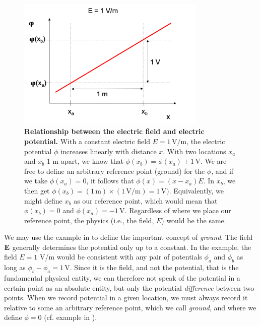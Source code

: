 \begin{figure}[!ht]
\begin{center}
\includegraphics[width=0.8\textwidth]{Figures/Basics/Ground.png}
\end{center}
\caption{\textbf{Relationship between the electric field and electric potential.} With a constant electric field $E = 1\,\si{\volt\per\metre}$, the electric potential $\phi$ increases linearly with distance $x$. With two locations $x_a$ and $x_b$ 1 \si{\metre} apart, we know that $\phi(x_b) = \phi(x_a) + 1\,\si{\volt}$. We are free to define an arbitrary reference point (ground) for the $\phi$, and if we take $\phi(x_a) = 0$, it follows that $\phi(x) = (x-x_a)E$. In $x_b$, we then get $\phi(x_b)=(1\,\si{\metre})\times(1\, \si{\volt\per\metre}) =1\,\si{\volt})$. Equivalently, we might define $x_b$ as our reference point, which would mean that $\phi(x_b) = 0$ and $\phi(x_a) = -1\,\si{\volt}$. Regardless of where we place our reference point, the physics (i.e., the field, $E$) would be the same.
}
\label{fig:Basics:Ground}
\end{figure}

We may use the example in  to define the important concept of \textit{ground}. The field ${\bf E}$ generally determines the potential only up to a constant. In the example, the field $E = 1$ V/m would be consistent with any pair of potentials $\phi_a$ and $\phi_b$ as long as $\phi_b - \phi_a =  1 \,\si{\volt}$. Since it is the field, and not the potential, that is the fundamental physical entity, we can therefore not speak of the potential in a certain point as an absolute entity, but only the potential \textit{difference} between two points. When we record potential in a given location, we must always record it relative to some an arbitrary reference point, which we call \textit{ground}, and where we define $\phi = 0$ (cf. example in ). 

